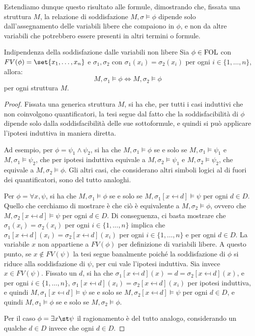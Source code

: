 Estendiamo dunque questo risultato alle formule, dimostrando che, fissata una struttura \(M\), la relazione di soddisfazione \(M,\sigma\models \phi\) dipende solo dall'assegnamento delle variabili libere che compaiono in \(\phi\), e non da altre variabili che potrebbero essere presenti in altri termini o formule.

\begin{proposition}[namedlabel={prop:satisfaction_independence}{Indipendenza della soddisfazione dalle variabili non libere}]{Indipendenza della soddisfazione dalle variabili non libere}
  Sia \(\phi\in\FOL\) con \(FV(\phi) = \set{x_1, \ldots, x_n}\) e \(\sigma_1,\sigma_2\) con \(\sigma_1(x_i) = \sigma_2(x_i)\) per ogni \(i\in\{1,\ldots,n\}\), allora:
  \[M,\sigma_1\models \phi \iff M,\sigma_2 \models \phi\]
  per ogni struttura \(M\).
\end{proposition}

\begin{proof}
  Fissata una generica struttura \(M\), si ha che, per tutti i casi induttivi che non coinvolgono quantificatori, la tesi segue dal fatto che la soddisfacibilità di \(\phi\) dipende solo dalla soddisfacibilità delle sue sottoformule, e quindi si può applicare l'ipotesi induttiva in maniera diretta.
  
  Ad esempio, per \(\phi = \psi_1 \land \psi_2\), si ha che \(M,\sigma_1\models \phi\) se e solo se \(M,\sigma_1\models \psi_1\) e \(M,\sigma_1\models \psi_2\), che per ipotesi induttiva equivale a \(M,\sigma_2\models \psi_1\) e \(M,\sigma_2\models \psi_2\), che equivale a \(M,\sigma_2\models \phi\). Gli altri casi, che considerano altri simboli logici al di fuori dei quantificatori, sono del tutto analoghi.

  Per \(\phi = \forall x, \psi\), si ha che \(M,\sigma_1\models \phi\) se e solo se \(M,\sigma_1[x\mapsfrom d]\models \psi\) per ogni \(d\in D\). Quello che cerchiamo di mostrare è che ciò è equivalente a \(M,\sigma_2\models \phi\), ovvero che \(M,\sigma_2[x\mapsfrom d]\models \psi\) per ogni \(d\in D\). Di conseguenza, ci basta mostrare che \(\sigma_1(x_i) = \sigma_2(x_i)\) per ogni \(i\in\{1,\ldots,n\}\) implica che \(\sigma_1[x\mapsfrom d](x_i) = \sigma_2[x\mapsfrom d](x_i)\) per ogni \(i\in\{1,\ldots,n\}\) e per ogni \(d\in D\).
  La variabile \(x\) non appartiene a \(FV(\phi)\) per definizione di variabili libere. A questo punto, se \(x \notin FV(\psi)\) la tesi segue banalmente poiché la soddisfazione di \(\phi\) si riduce alla soddisfazione di \(\psi\), per cui vale l'ipotesi induttiva.
  Sia invece \(x\in FV(\psi)\). Fissato un \(d\), si ha che \(\sigma_1[x\mapsfrom d](x) = d = \sigma_2[x\mapsfrom d](x)\), e per ogni \(i\in\{1,\ldots,n\}\), \(\sigma_1[x\mapsfrom d](x_i) = \sigma_2[x\mapsfrom d](x_i)\) per ipotesi induttiva, e quindi \(M,\sigma_1[x\mapsfrom d]\models \psi\) se e solo se \(M,\sigma_2[x\mapsfrom d]\models \psi\) per ogni \(d\in D\), e quindi \(M,\sigma_1\models \phi\) se e solo se \(M,\sigma_2\models \phi\).

  Per il caso \(\phi = \exists x\st \psi\) il ragionamento è del tutto analogo, considerando un qualche \(d\in D\) invece che ogni \(d\in D\).
\end{proof}


